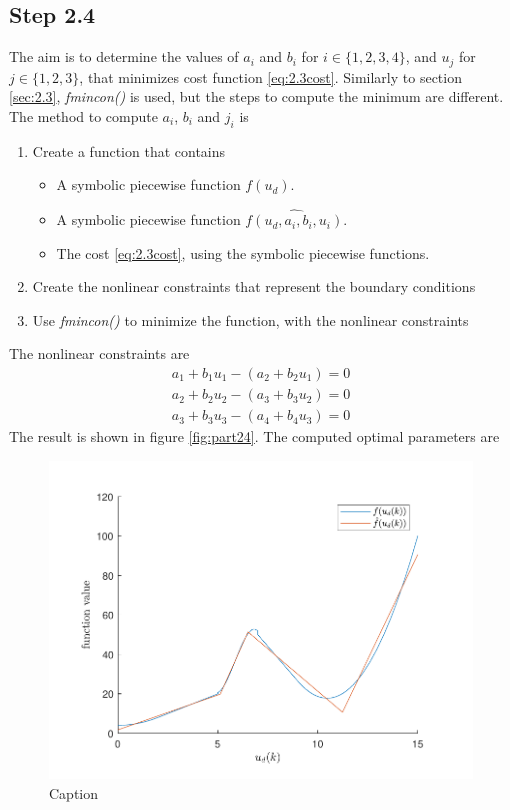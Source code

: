 \subsection*{Step 2.4}
The aim is to determine the values of $a_i$ and $b_i$ for $i \in \{1,2,3,4\}$, and $u_j$  for $j \in \{1,2,3\}$, that minimizes cost function \ref{eq:2.3cost}. Similarly to section \ref{sec:2.3}, \textit{fmincon()} is used, but the steps to compute the minimum are different. The method to compute $a_i$, $b_i$ and $j_i$ is
\begin{enumerate}
    \item Create a function that contains
    \begin{itemize}
        \item A symbolic piecewise function $f(u_d)$.
        \item A symbolic piecewise function $\hat{f(u_d,a_i,b_i,u_i)}$.
        \item The cost \ref{eq:2.3cost}, using the symbolic piecewise functions.
    \end{itemize}
    \item Create the nonlinear constraints that represent the boundary conditions
    \item Use \textit{fmincon()} to minimize the function, with the nonlinear constraints
\end{enumerate}
The nonlinear constraints are 
\begin{align*}
    a_1 + b_1u_1 - (a_2+b_2u_1) = 0\\
    a_2 + b_2u_2 - (a_3+b_3u_2) = 0\\
    a_3 + b_3u_3 - (a_4+b_4u_3) = 0
\end{align*}
The result is shown in figure \ref{fig:part24}. The computed optimal parameters are
\begin{figure}
    \centering
    \includegraphics{Latex/images/step24.pdf}
    \caption{Caption}
    \label{fig:my_label}
\end{figure}
